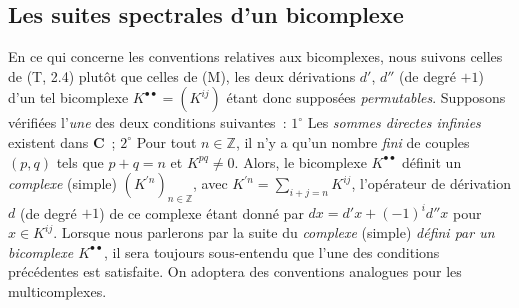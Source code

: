 \subsection{Les suites spectrales d'un bicomplexe}
\label{subsection:0.11.3-fr}

\begin{env}[11.3.1]
\label{0.11.3.1-fr}
En ce qui concerne les conventions relatives aux bicomplexes, nous suivons
celles de (T, 2.4) plutôt que celles de (M), les deux dérivations $d'$, $d''$
(de degré $+1$) d'un tel bicomplexe
$K^{\bullet\bullet}=(K^{ij})$ étant donc supposées \emph{permutables}.
Supposons vérifiées l'\emph{une} des deux conditions suivantes~:
$1^\circ$ Les \emph{sommes directes infinies} existent dans $\boldsymbol{C}$~;
$2^\circ$ Pour tout $n\in\mathbb Z$, il n'y a qu'un nombre
    \emph{fini} de couples $(p,q)$ tels que $p+q=n$ et $K^{pq}\ne0$.
Alors, le bicomplexe $K^{\bullet\bullet}$ définit un \emph{complexe} (simple)
$(K^{\prime n})_{n\in\mathbb Z}$, avec
$K^{\prime n}=\sum_{i+j=n}K^{ij}$, l'opérateur de dérivation $d$ (de degré
$+1$) de ce complexe étant donné par
$dx=d'x+(-1)^i d''x$ pour $x\in K^{ij}$. Lorsque nous parlerons par la suite
du \emph{complexe} (simple) \emph{défini par un bicomplexe $K^{\bullet\bullet}$}, il
sera toujours sous-entendu que l'une des conditions précédentes est satisfaite.
On adoptera des conventions analogues pour les multicomplexes.


\end{env}
